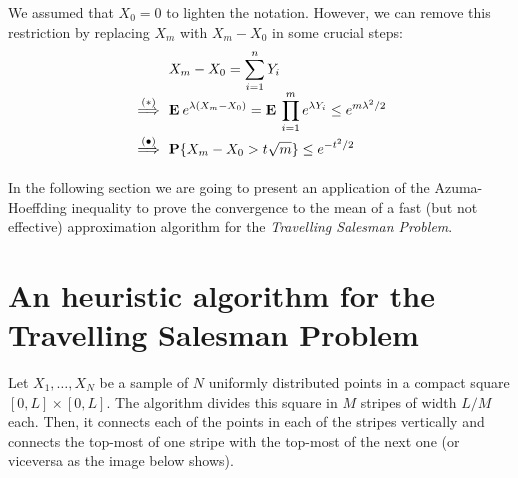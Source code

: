 \begin{remark} We assumed that $X_0 = 0$ to lighten the notation. However, we can remove this restriction by replacing $X_m$ with $X_m - X_0$ in some crucial steps:
    \[\everymath{\displaystyle}\arraycolsep=1.8pt\def\arraystretch{1.8}
        \begin{array}{rl}
            & X_m-X_0 = \sum_{i = 1}^n Y_i\\
            \overset{(*)}{\implies} & \E e^{\lambda (X_m-X_0)} = \E \prod_{i = 1}^{m} e^{\lambda Y_i} \leq e^{m \lambda^2 / 2}\\
            \overset{(\bullet)}{\implies} & \P\{X_m-X_0 > t\sqrt{m}\} \leq e^{-t^2/2}
        \end{array} 
        \] 

\end{remark}    

In the following section we are going to present an application of the Azuma-Hoeffding inequality to prove the convergence to the mean of a fast (but not effective) approximation algorithm for the \textit{Travelling Salesman Problem}. 

\section{An heuristic algorithm for the Travelling Salesman Problem}

Let $X_1,\ldots, X_N$ be a sample of $N$ uniformly distributed points in a compact square $[0,L]\times [0,L]$. The algorithm divides this square in $M$ stripes of width $L/M$ each. Then, it connects each of the points in each of the stripes vertically and connects the top-most of one stripe with the top-most of the next one (or viceversa as the image below shows).

